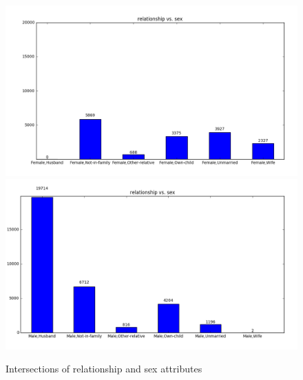 \documentclass[twoside,12pt]{article}
\begin{document}
\begin{figure}
\includegraphics[scale=0.5]{relationship_vs_sex_male.png}
\includegraphics[scale=0.5]{relationship_vs_sex_female.png}
\caption{Intersections of relationship and sex attributes}
\end{figure}
\end{document}

